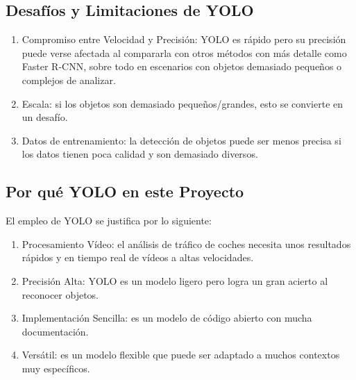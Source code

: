 \subsection{Desafíos y Limitaciones de YOLO}

\begin{enumerate}
    \item Compromiso entre Velocidad y Precisión: YOLO es rápido pero su precisión puede verse afectada al compararla con otros métodos con más detalle como Faster R-CNN, sobre todo en escenarios con objetos demasiado pequeños o complejos de analizar.
    \item Escala: si los objetos son demasiado pequeños/grandes, esto se convierte en un desafío.
    \item Datos de entrenamiento: la detección de objetos puede ser menos precisa si los datos tienen poca calidad y son demasiado diversos.
\end{enumerate}

\subsection{Por qué YOLO en este Proyecto}

El empleo de YOLO se justifica por lo siguiente:
\begin{enumerate}
    \item Procesamiento Vídeo: el análisis de tráfico de coches necesita unos resultados rápidos y en tiempo real de vídeos a altas velocidades.
    \item Precisión Alta: YOLO es un modelo ligero pero logra un gran acierto al reconocer objetos.
    \item Implementación Sencilla: es un modelo de código abierto con mucha documentación.
    \item Versátil: es un modelo flexible que puede ser adaptado a muchos contextos muy específicos.
\end{enumerate}

